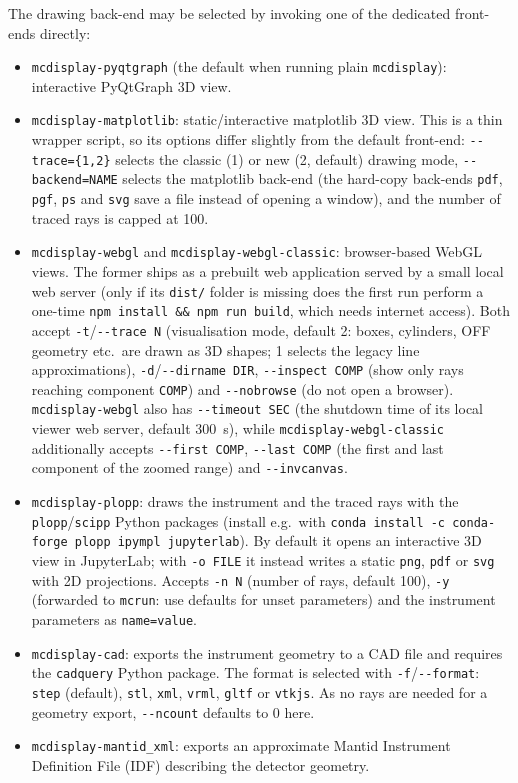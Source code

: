 The drawing back-end may be selected by invoking one of the dedicated
front-ends directly:
\begin{itemize}
\item \verb+mcdisplay-pyqtgraph+ (the default when running plain
  \verb+mcdisplay+): interactive PyQtGraph 3D view.
\item \verb+mcdisplay-matplotlib+: static/interactive matplotlib 3D view. This
  is a thin wrapper script, so its options differ slightly from the default
  front-end: \verb+--trace={1,2}+ selects the classic (1) or new (2, default)
  drawing mode, \verb+--backend=NAME+ selects the matplotlib back-end (the
  hard-copy back-ends \texttt{pdf}, \texttt{pgf}, \texttt{ps} and \texttt{svg}
  save a file instead of opening a window), and the number of traced rays is
  capped at 100.
\item \verb+mcdisplay-webgl+ and \verb+mcdisplay-webgl-classic+: browser-based
  WebGL views. The former ships as a prebuilt web application served by a small
  local web server (only if its \texttt{dist/} folder is missing does the first
  run perform a one-time \texttt{npm install \&\& npm run build}, which needs
  internet access). Both accept \verb+-t+/\verb+--trace N+ (visualisation mode,
  default 2: boxes, cylinders, OFF geometry etc.\ are drawn as 3D shapes; 1
  selects the legacy line approximations), \verb+-d+/\verb+--dirname DIR+,
  \verb+--inspect COMP+ (show only rays reaching component \texttt{COMP}) and
  \verb+--nobrowse+ (do not open a browser). \verb+mcdisplay-webgl+ also has
  \verb+--timeout SEC+ (the shutdown time of its local viewer web server,
  default 300~s), while \verb+mcdisplay-webgl-classic+ additionally accepts
  \verb+--first COMP+, \verb+--last COMP+ (the first and last component of the
  zoomed range) and \verb+--invcanvas+.
\item \verb+mcdisplay-plopp+: draws the instrument and the traced rays with
  the \texttt{plopp}/\texttt{scipp} Python packages (install e.g.\ with
  \texttt{conda install -c conda-forge plopp ipympl jupyterlab}). By default it
  opens an interactive 3D view in JupyterLab; with \verb+-o FILE+ it instead
  writes a static \texttt{png}, \texttt{pdf} or \texttt{svg} with 2D
  projections. Accepts \verb+-n N+ (number of rays, default 100), \verb+-y+
  (forwarded to \verb+mcrun+: use defaults for unset parameters) and the
  instrument parameters as \texttt{name=value}.
\item \verb+mcdisplay-cad+: exports the instrument geometry to a CAD file and
  requires the \texttt{cadquery} Python package. The format is selected with
  \verb+-f+/\verb+--format+: \texttt{step} (default), \texttt{stl},
  \texttt{xml}, \texttt{vrml}, \texttt{gltf} or \texttt{vtkjs}. As no rays
  are needed for a geometry export, \verb+--ncount+ defaults to 0 here.
\item \verb+mcdisplay-mantid_xml+: exports an approximate Mantid Instrument
  Definition File (IDF) describing the detector geometry.
\end{itemize}
